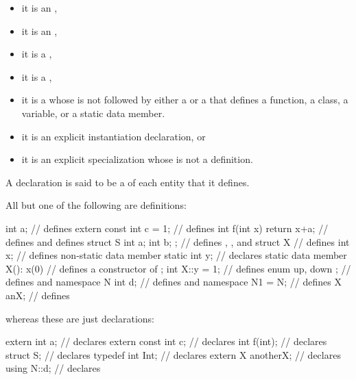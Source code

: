 \begin{itemize}
\item
it is an
,
\item
it is an
,
\item it is
a ,
\item it is
a ,
\item it is
a 
whose  is not followed by
either a  or a 
that defines a function, a class, a variable, or a static data member.
\item it is
an explicit instantiation declaration, or
\item it is
an explicit specialization whose
 is not a definition.
\end{itemize}
A declaration is said to be a  of each entity that it defines.
\begin{example}
All but one of the following are definitions:
\begin{codeblock}
int a;                          // defines 
extern const int c = 1;         // defines 
int f(int x) { return x+a; }    // defines  and defines 
struct S { int a; int b; };     // defines , , and 
struct X {                      // defines 
  int x;                        // defines non-static data member 
  static int y;                 // declares static data member 
  X(): x(0) { }                 // defines a constructor of 
};
int X::y = 1;                   // defines 
enum { up, down };              // defines  and 
namespace N { int d; }          // defines  and 
namespace N1 = N;               // defines 
X anX;                          // defines 

\end{codeblock}
whereas these are just declarations:
\begin{codeblock}
extern int a;                   // declares 
extern const int c;             // declares 
int f(int);                     // declares 
struct S;                       // declares 
typedef int Int;                // declares 
extern X anotherX;              // declares 
using N::d;                     // declares 
\end{codeblock}
\end{example}

